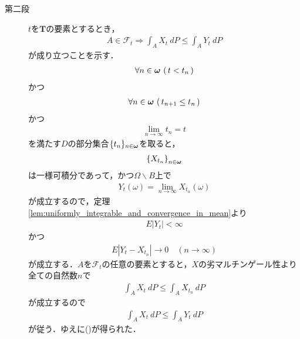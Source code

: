 \begin{sketch}
\begin{description}
			\item[第二段] $t$を$\mathbf{T}$の要素とするとき，
				\begin{align}
					A \in \mathscr{F}_t \Longrightarrow \int_A X_t\ dP \leq \int_A Y_t\ dP
					\label{fom:thm_right_limit_process_is_a_RCLL_submartingale_1}
				\end{align}
				が成り立つことを示す．
				\begin{align}
					\forall n \in {\boldsymbol \omega}\, \left(\, t < t_n\, \right)
				\end{align}
				かつ
				\begin{align}
					\forall n \in {\boldsymbol \omega}\, \left(\, t_{n+1} \leq t_n\, \right)
				\end{align}
				かつ
				\begin{align}
					\lim_{n \to \infty} t_n = t
				\end{align}
				を満たす$D$の部分集合$\{t_n\}_{n \in {\boldsymbol \omega}}$を取ると，
				\begin{align}
					\left\{X_{t_n}\right\}_{n \in {\boldsymbol \omega}}
				\end{align}
				は一様可積分であって，かつ$\Omega \backslash B$上で
				\begin{align}
					Y_t(\omega) = \lim_{n \to \infty} X_{t_n}(\omega)
				\end{align}
				が成立するので，定理\ref{lem:uniformly_integrable_and_convergence_in_mean}より
				\begin{align}
					E|Y_t| < \infty
				\end{align}
				かつ
				\begin{align}
					E\left|Y_t - X_{t_n}\right| \longrightarrow 0 \quad (n \longrightarrow \infty)
					\label{fom:thm_right_limit_process_is_a_RCLL_submartingale_2}
				\end{align}
				が成立する．$A$を$\mathscr{F}_t$の任意の要素とすると，$X$の劣マルチンゲール性より全ての自然数$n$で
				\begin{align}
					\int_A X_t\ dP \leq \int_A X_{t_n}\ dP
				\end{align}
				が成立するので
				\begin{align}
					\int_A X_t\ dP \leq \int_A Y_t\ dP
				\end{align}
				が従う．ゆえに()が得られた．
				

\end{description}
\end{sketch}
